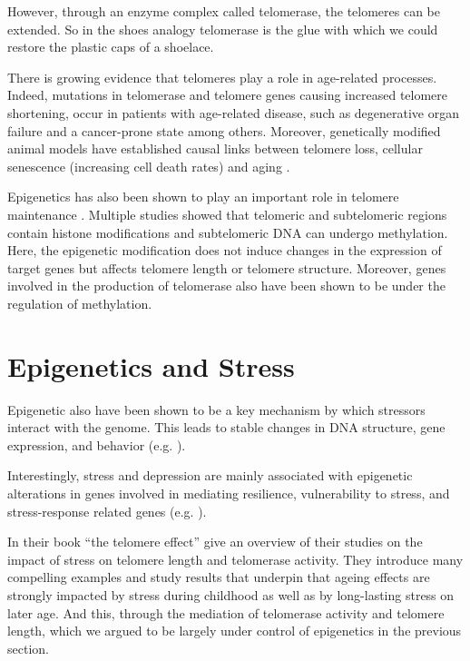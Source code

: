 \documentclass[
  11pt,
]{book}
\begin{document}
However, through an enzyme complex called telomerase, the telomeres can be extended. So in the shoes analogy telomerase is the glue with which we could restore the plastic caps of a shoelace.

There is growing evidence that telomeres play a role in age-related processes. Indeed, mutations in telomerase and telomere genes causing increased telomere shortening, occur in patients with age-related disease, such as degenerative organ failure and a cancer-prone state among others. Moreover,
genetically modified animal models have established causal links between telomere loss, cellular senescence (increasing cell death rates) and aging \citep{Adwan2018}.

Epigenetics has also been shown to play an important role in telomere maintenance \citep{Adwan2018}.
Multiple studies showed that telomeric and subtelomeric regions contain histone modifications and subtelomeric DNA can undergo methylation.
Here, the epigenetic modification does not induce changes in the expression of target genes but affects telomere length or telomere structure.
Moreover, genes involved in the production of telomerase also have been shown to be under the regulation of methylation.

\hypertarget{epigenetics-and-stress}{%
\section{Epigenetics and Stress}\label{epigenetics-and-stress}}

Epigenetic also have been shown to be a key mechanism by which stressors interact with the genome.
This leads to stable changes in DNA structure, gene expression, and behavior (e.g. \citet{Park2019}).

Interestingly, stress and depression are mainly
associated with epigenetic alterations in genes involved in mediating resilience, vulnerability to stress, and stress-response related genes (e.g. \citet{Park2019}).

In their book ``the telomere effect'' \citet{BlackburnEpel2017} give an overview of their studies on the impact of stress on telomere length and telomerase activity.
They introduce many compelling examples and study results that underpin that ageing effects are strongly impacted by stress during childhood as well as by long-lasting stress on later age. And this, through the mediation of telomerase activity and telomere length, which we argued to be largely under control of epigenetics in the previous section.
\end{document}
